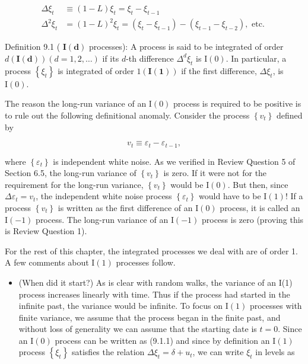 \documentclass[10pt]{article}
\begin{document}
\begin{align*}
\Delta \xi_{t} & \equiv(1-L) \xi_{t}=\xi_{t}-\xi_{t-1} \\
\Delta^{2} \xi_{t} & =(1-L)^{2} \xi_{t}=\left(\xi_{t}-\xi_{t-1}\right)-\left(\xi_{t-1}-\xi_{t-2}\right), \text { etc. } \tag{9.1.2}
\end{align*}


Definition 9.1 ( $\mathbf{I}(\boldsymbol{d})$ processes): A process is said to be integrated of order $d (\mathbf{I}(\boldsymbol{d}))(d=1,2, \ldots)$ if its $d$-th difference $\Delta^{d} \xi_{t}$ is $\mathrm{I}(0)$. In particular, a process $\left\{\xi_{t}\right\}$ is integrated of order $1(\mathbf{I}(\mathbf{1}))$ if the first difference, $\Delta \xi_{t}$, is $\mathrm{I}(0)$.

The reason the long-run variance of an $\mathrm{I}(0)$ process is required to be positive is to rule out the following definitional anomaly. Consider the process $\left\{v_{t}\right\}$ defined by


\begin{equation*}
v_{t} \equiv \varepsilon_{t}-\varepsilon_{t-1}, \tag{9.1.3}
\end{equation*}


where $\left\{\varepsilon_{t}\right\}$ is independent white noise. As we verified in Review Question 5 of Section 6.5, the long-run variance of $\left\{v_{t}\right\}$ is zero. If it were not for the requirement for the long-run variance, $\left\{v_{t}\right\}$ would be $\mathrm{I}(0)$. But then, since $\Delta \varepsilon_{t}=v_{t}$, the independent white noise process $\left\{\varepsilon_{t}\right\}$ would have to be $\mathrm{I}(1)!$ If a process $\left\{v_{t}\right\}$ is written as the first difference of an $\mathrm{I}(0)$ process, it is called an $\mathrm{I}(-1)$ process. The long-run variance of an $\mathrm{I}(-1)$ process is zero (proving this is Review Question 1).

For the rest of this chapter, the integrated processes we deal with are of order 1. A few comments about $\mathrm{I}(1)$ processes follow.

\begin{itemize}
  \item (When did it start?) As is clear with random walks, the variance of an I(1) process increases linearly with time. Thus if the process had started in the infinite past, the variance would be infinite. To focus on $\mathrm{I}(1)$ processes with finite variance, we assume that the process began in the finite past, and without loss of generality we can assume that the starting date is $t=0$. Since an $\mathrm{I}(0)$ process can be written as (9.1.1) and since by definition an $\mathrm{I}(1)$ process $\left\{\xi_{t}\right\}$ satisfies the relation $\Delta \xi_{t}=\delta+u_{t}$, we can write $\xi_{t}$ in levels as
\end{itemize}
\end{document}
